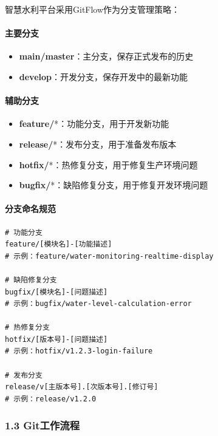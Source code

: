 智慧水利平台采用GitFlow作为分支管理策略：

\paragraph{主要分支}\label{ux4e3bux8981ux5206ux652f}

\begin{itemize}
\tightlist
\item
  \textbf{main/master}：主分支，保存正式发布的历史
\item
  \textbf{develop}：开发分支，保存开发中的最新功能
\end{itemize}

\paragraph{辅助分支}\label{ux8f85ux52a9ux5206ux652f}

\begin{itemize}
\tightlist
\item
  \textbf{feature/}*：功能分支，用于开发新功能
\item
  \textbf{release/}*：发布分支，用于准备发布版本
\item
  \textbf{hotfix/}*：热修复分支，用于修复生产环境问题
\item
  \textbf{bugfix/}*：缺陷修复分支，用于修复开发环境问题
\end{itemize}

\paragraph{分支命名规范}\label{ux5206ux652fux547dux540dux89c4ux8303}

\begin{lstlisting}
# 功能分支
feature/[模块名]-[功能描述]
# 示例：feature/water-monitoring-realtime-display

# 缺陷修复分支
bugfix/[模块名]-[问题描述]
# 示例：bugfix/water-level-calculation-error

# 热修复分支
hotfix/[版本号]-[问题描述]
# 示例：hotfix/v1.2.3-login-failure

# 发布分支
release/v[主版本号].[次版本号].[修订号]
# 示例：release/v1.2.0
\end{lstlisting}

\subsubsection{1.3 Git工作流程}\label{gitux5de5ux4f5cux6d41ux7a0b}


